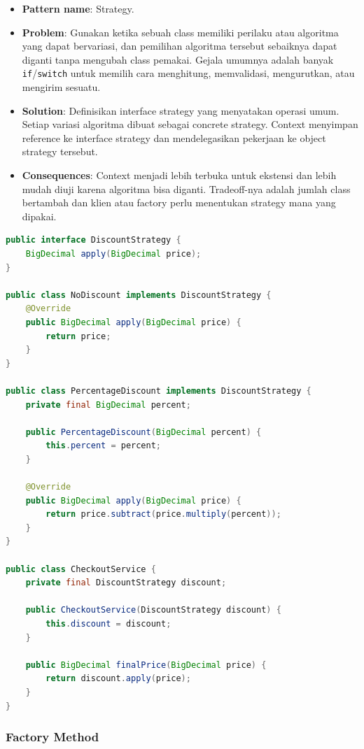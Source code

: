\begin{itemize}
    \item \textbf{Pattern name}: Strategy.
    \item \textbf{Problem}: Gunakan ketika sebuah class memiliki perilaku atau algoritma yang dapat bervariasi, dan pemilihan algoritma tersebut sebaiknya dapat diganti tanpa mengubah class pemakai. Gejala umumnya adalah banyak \texttt{if}/\texttt{switch} untuk memilih cara menghitung, memvalidasi, mengurutkan, atau mengirim sesuatu.
    \item \textbf{Solution}: Definisikan interface strategy yang menyatakan operasi umum. Setiap variasi algoritma dibuat sebagai concrete strategy. Context menyimpan reference ke interface strategy dan mendelegasikan pekerjaan ke object strategy tersebut.
    \item \textbf{Consequences}: Context menjadi lebih terbuka untuk ekstensi dan lebih mudah diuji karena algoritma bisa diganti. Tradeoff-nya adalah jumlah class bertambah dan klien atau factory perlu menentukan strategy mana yang dipakai.
\end{itemize}

\begin{lstlisting}[language=Java, caption={Strategy Pattern untuk diskon}, label={lst:strategy-pattern}]
public interface DiscountStrategy {
    BigDecimal apply(BigDecimal price);
}

public class NoDiscount implements DiscountStrategy {
    @Override
    public BigDecimal apply(BigDecimal price) {
        return price;
    }
}

public class PercentageDiscount implements DiscountStrategy {
    private final BigDecimal percent;

    public PercentageDiscount(BigDecimal percent) {
        this.percent = percent;
    }

    @Override
    public BigDecimal apply(BigDecimal price) {
        return price.subtract(price.multiply(percent));
    }
}

public class CheckoutService {
    private final DiscountStrategy discount;

    public CheckoutService(DiscountStrategy discount) {
        this.discount = discount;
    }

    public BigDecimal finalPrice(BigDecimal price) {
        return discount.apply(price);
    }
}
\end{lstlisting}

\subsubsection{Factory Method}

